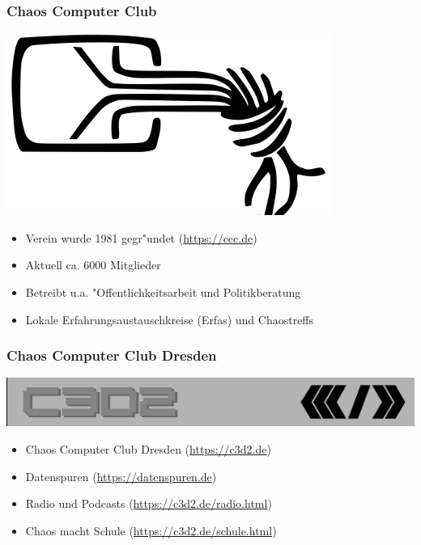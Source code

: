 \documentclass[12pt]{beamer}
\begin{document}
\begin{frame}
    \frametitle{Chaos Computer Club}
    \begin{center}
	\includegraphics[height=0.2\textheight]{img/chaosknoten.png}
    \end{center}	
    \begin{itemize}
      \item<1-> Verein wurde 1981 gegr"undet (\url{https://ccc.de})          
      \item<2-> Aktuell ca. 6000 Mitglieder
      \item<3-> Betreibt u.a. "Offentlichkeitsarbeit und Politikberatung      
      \item<4-> Lokale Erfahrungsaustauschkreise (Erfas) und Chaostreffs
    \end{itemize}
\end{frame}

\begin{frame}
  \frametitle{Chaos Computer Club Dresden}
  \begin{center}
    \includegraphics[height=0.1\textheight]{img/c3d2_logo.png}
  \end{center}
  \begin{itemize}
    \item<1-> Chaos Computer Club Dresden (\url{https://c3d2.de})          
    \item<2-> Datenspuren (\url{https://datenspuren.de})
    \item<3-> Radio und Podcasts (\url{https://c3d2.de/radio.html})
    \item<4-> Chaos macht Schule (\url{https://c3d2.de/schule.html})
  \end{itemize}
\end{frame}
\end{document}
